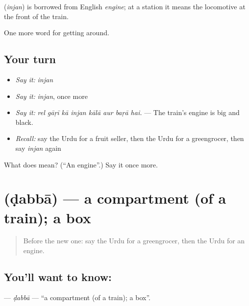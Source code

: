 \begin{cousinweb}
\textbf{} (\emph{injan}) is borrowed from English \emph{engine}; at a station it means the locomotive at the front of the train.
\end{cousinweb}

\begin{grammarlens}[title={What you've built}]
One more word for getting around.
\end{grammarlens}

\subsection*{Your turn}
\begin{itemize}
\raggedright
  \item \emph{Say it:} \emph{injan}
  \item \emph{Say it:} \emph{injan}, once more
  \item \emph{Say it:} \emph{rel gāṛī kā injan kālā aur baṛā hai.} — The train's engine is big and black.
  \item \emph{Recall:} say the Urdu for a fruit seller, then the Urdu for a greengrocer, then say \emph{injan} again
\end{itemize}

\begin{tcolorbox}[breakable,colback=teal!4,colframe=teal!35!black,title={Before you move on}]
What does  mean? (\textquotedblleft{}An engine\textquotedblright{}.) Say it once more.
\end{tcolorbox}
\section[\texorpdfstring{\ur{ڈبہ} (ḍabbā)}{ڈبہ (ḍabbā)}]{ (ḍabbā) — a compartment (of a train); a box}

\label{lesson:UR-C386-dabba}



\begin{quote}
Before the new one: say the Urdu for a greengrocer, then the Urdu for an engine.
\end{quote}

\subsection*{You'll want to know: }
\textbf{} — \emph{ḍabbā} — \textquotedblleft{}a compartment (of a train); a box\textquotedblright{}.

